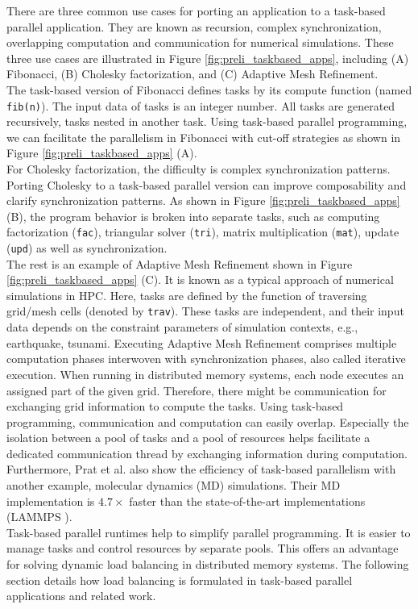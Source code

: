 \noindent There are three common use cases for porting an application to a task-based parallel application. They are known as recursion, complex synchronization, overlapping computation and communication for numerical simulations. These three use cases are illustrated in Figure \ref{fig:preli_taskbased_apps}, including (A) Fibonacci, (B) Cholesky factorization, and (C) Adaptive Mesh Refinement.\\

The task-based version of Fibonacci defines tasks by its compute function (named \texttt{fib(n)}). The input data of tasks is an integer number. All tasks are generated recursively, tasks nested in another task. Using task-based parallel programming, we can facilitate the parallelism in Fibonacci with cut-off strategies as shown in Figure \ref{fig:preli_taskbased_apps} (A).\\

For Cholesky factorization, the difficulty is complex synchronization patterns. Porting Cholesky to a task-based parallel version can improve composability and clarify synchronization patterns. As shown in Figure \ref{fig:preli_taskbased_apps} (B), the program behavior is broken into separate tasks, such as computing factorization (\texttt{fac}), triangular solver (\texttt{tri}), matrix multiplication (\texttt{mat}), update (\texttt{upd}) as well as synchronization.\\

The rest is an example of Adaptive Mesh Refinement shown in Figure \ref{fig:preli_taskbased_apps} (C). It is known as a typical approach of numerical simulations in HPC. Here, tasks are defined by the function of traversing grid/mesh cells (denoted by \texttt{trav}). These tasks are independent, and their input data depends on the constraint parameters of simulation contexts, e.g., earthquake, tsunami. Executing Adaptive Mesh Refinement comprises multiple computation phases interwoven with synchronization phases, also called iterative execution. When running in distributed memory systems, each node executes an assigned part of the given grid. Therefore, there might be communication for exchanging grid information to compute the tasks. Using task-based programming, communication and computation can easily overlap. Especially the isolation between a pool of tasks and a pool of resources helps facilitate a dedicated communication thread by exchanging information during computation. Furthermore, Prat et al. \cite{prat2018taskbasedmdsim} also show the efficiency of task-based parallelism with another example, molecular dynamics (MD) simulations. Their MD implementation is $4.7\times$ faster than the state-of-the-art implementations (LAMMPS \cite{lammps2008mdsim}).\\

\noindent Task-based parallel runtimes help to simplify parallel programming. It is easier to manage tasks and control resources by separate pools. This offers an advantage for solving dynamic load balancing in distributed memory systems. The following section details how load balancing is formulated in task-based parallel applications and related work. 
